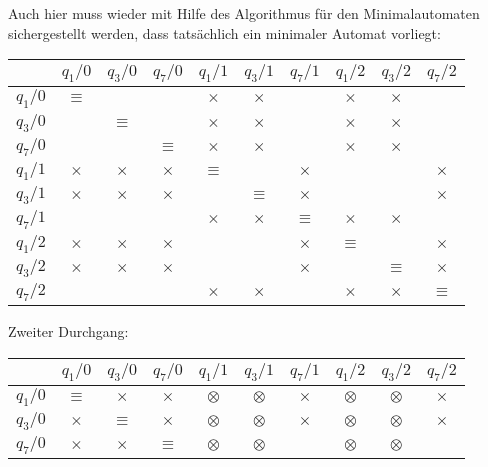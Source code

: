 \begin{loesung}
\begin{teilaufgaben}
\begin{center}
\end{center}
Auch hier muss wieder mit Hilfe des Algorithmus für den Minimalautomaten
sichergestellt werden, dass tatsächlich ein minimaler Automat vorliegt:
\begin{center}
\begin{tabular}{|c|ccccccccc|}
\hline
         &$q_1/0$  &$q_3/0$  &$q_7/0$  &$q_1/1$  &$q_3/1$  &$q_7/1$  &$q_1/2$  &$q_3/2$  &$q_7/2$  \\
\hline
$q_1/0$  &$\equiv$ &$       $&$       $&$\times $&$\times $&$       $&$\times $&$\times $&$       $\\
$q_3/0$  &$       $&$\equiv$ &$       $&$\times $&$\times $&$       $&$\times $&$\times $&$       $\\
$q_7/0$  &$       $&$       $&$\equiv$ &$\times $&$\times $&$       $&$\times $&$\times $&$       $\\
$q_1/1$  &$\times $&$\times $&$\times $&$\equiv$ &$       $&$\times $&$       $&$       $&$\times $\\
$q_3/1$  &$\times $&$\times $&$\times $&$       $&$\equiv$ &$\times $&$       $&$       $&$\times $\\
$q_7/1$  &$       $&$       $&$       $&$\times $&$\times $&$\equiv$ &$\times $&$\times $&$       $\\
$q_1/2$  &$\times $&$\times $&$\times $&$       $&$       $&$\times $&$\equiv$ &$       $&$\times $\\
$q_3/2$  &$\times $&$\times $&$\times $&$       $&$       $&$\times $&$       $&$\equiv$ &$\times $\\
$q_7/2$  &$       $&$       $&$       $&$\times $&$\times $&$       $&$\times $&$\times $&$\equiv$ \\
\hline
\end{tabular}
\end{center}
Zweiter Durchgang:
\begin{center}
\begin{tabular}{|c|ccccccccc|}
\hline
         &$q_1/0$  &$q_3/0$  &$q_7/0$  &$q_1/1$  &$q_3/1$  &$q_7/1$  &$q_1/2$  &$q_3/2$  &$q_7/2$  \\
\hline
$q_1/0$  &$\equiv$ &$\times $&$\times $&$\otimes$&$\otimes$&$\times $&$\otimes$&$\otimes$&$\times $\\
$q_3/0$  &$\times $&$\equiv$ &$\times $&$\otimes$&$\otimes$&$\times $&$\otimes$&$\otimes$&$\times $\\
$q_7/0$  &$\times $&$\times $&$\equiv$ &$\otimes$&$\otimes$&$       $&$\otimes$&$\otimes$&$       $\\

\end{tabular}
\end{center}
\end{teilaufgaben}
\end{loesung}
